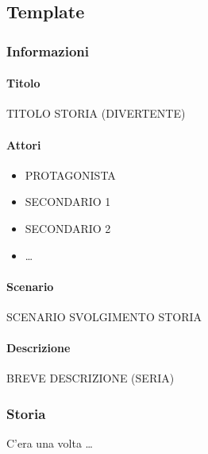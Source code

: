 \documentclass[../../UUX_Personas.tex]{subfiles}
\begin{document}
	\subsection{Template}
	\subsubsection{Informazioni}
	\paragraph{Titolo} TITOLO STORIA (DIVERTENTE)
	\paragraph{Attori}
	\begin{itemize}
		\item PROTAGONISTA
		\item SECONDARIO 1
		\item SECONDARIO 2
		\item \ldots
	\end{itemize}
	\paragraph{Scenario} SCENARIO SVOLGIMENTO STORIA
	\paragraph{Descrizione} BREVE DESCRIZIONE (SERIA)

	\newpage
	\subsubsection{Storia} 
	C'era una volta \ldots
\end{document}
